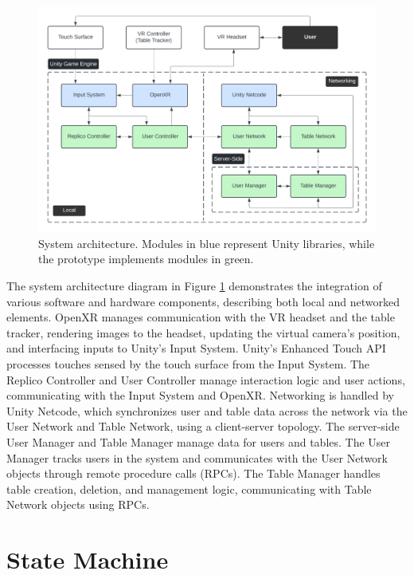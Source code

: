     \begin{figure}[h]
        \centering
        \includegraphics[width=.97\linewidth]{figures/architecture.png}
        \caption{System architecture. Modules in blue represent Unity libraries, while the prototype implements modules in green.}
        \label{fig:architecture}
    \end{figure}
    
    The system architecture diagram in Figure \ref{fig:architecture} demonstrates the integration of various software and hardware components, describing both local and networked elements. OpenXR manages communication with the VR headset and the table tracker, rendering images to the headset, updating the virtual camera's position, and interfacing inputs to Unity's Input System. Unity's Enhanced Touch API processes touches sensed by the touch surface from the Input System. The Replico Controller and User Controller manage interaction logic and user actions, communicating with the Input System and OpenXR. Networking is handled by Unity Netcode, which synchronizes user and table data across the network via the User Network and Table Network, using a client-server topology. The server-side User Manager and Table Manager manage data for users and tables. The User Manager tracks users in the system and communicates with the User Network objects through remote procedure calls (RPCs). The Table Manager handles table creation, deletion, and management logic, communicating with Table Network objects using RPCs.



\section{State Machine}

